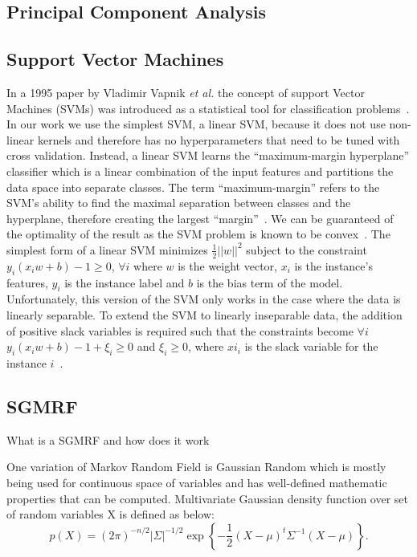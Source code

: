 \documentclass{article} %
\begin{document}
\subsection{Principal Component Analysis}

\subsection{Support Vector Machines}
In a 1995 paper by Vladimir Vapnik \emph{et al.} the concept of support 
Vector Machines (SVMs) was introduced  as a statistical tool for 
classification problems~\cite{shmilovici2005support}. In our work we
use the simplest SVM, a linear SVM, because it does not use non-linear
kernels and therefore has no hyperparameters that need to be tuned
with cross validation. Instead, a linear SVM learns the ``maximum-margin
hyperplane'' classifier which is a linear combination of the input 
features and partitions the data space into separate classes. The term 
``maximum-margin'' refers to the SVM's ability to find the maximal 
separation between classes and the hyperplane, therefore creating the 
largest ``margin''~\cite{shmilovici2005support}. We can be guaranteed of
the optimality of the result as the SVM problem is known to be 
convex~\cite{burges1998tutorial}. The simplest form of a linear SVM 
minimizes $\frac{1}{2}||w||^2$ subject to the constraint 
$y_i (x_i w + b) - 1 \ge 0 $, $\forall i$ where $w$ is the weight vector,
$x_i$ is the instance's features, $y_i$ is the instance label and $b$ is
the bias term of the model. Unfortunately, this version of the SVM only
works in the case where the data is linearly separable. To extend the SVM
to linearly inseparable data, the addition of positive slack variables is
required such that the constraints become $\forall i$ 
$y_i (x_i w + b) - 1 + \xi_i \ge 0 $ and $\xi_i \ge 0$, where $xi_i$ is 
the slack variable for the instance $i$~\cite{burges1998tutorial}.


\subsection{SGMRF}
What is a SGMRF and how does it work

One variation of Markov Random Field is Gaussian Random which is mostly being used for continuous space of variables and has well-defined mathematic properties that can be computed. Multivariate Gaussian density function over set of random variables X is defined as below: 
\begin{equation}\label{gaussian1}
p(X) = (2\pi)^{-n/2} |\Sigma|^{-1/2} \exp\left\{ -\frac{1}{2}(X - \mu)^t \Sigma^{-1} (X - \mu) \right\}.
\end{equation}
 
\end{document}
